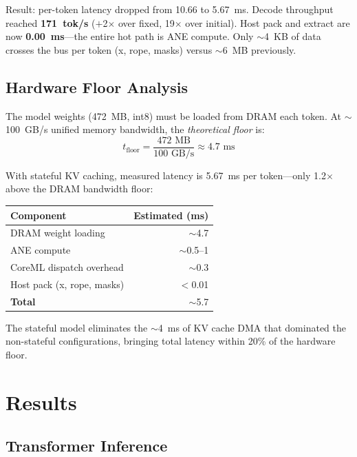\documentclass[11pt,twocolumn]{article}
\begin{document}
Result: per-token latency dropped from 10.66 to 5.67~ms.  Decode
throughput reached \textbf{171~tok/s} ($+$2$\times$ over fixed,
19$\times$ over initial).  Host pack and extract are now
\textbf{0.00~ms}---the entire hot path is ANE compute.  Only
$\sim$4~KB of data crosses the bus per token (x, rope, masks) versus
$\sim$6~MB previously.

\subsection{Hardware Floor Analysis}

The model weights (472~MB, int8) must be loaded from DRAM each token.
At $\sim$100~GB/s unified memory bandwidth, the \emph{theoretical
floor} is:
\begin{equation}
t_\text{floor} = \frac{472 \text{ MB}}{100 \text{ GB/s}} \approx 4.7 \text{ ms}
\end{equation}

With stateful KV caching, measured latency is 5.67~ms per token---only
1.2$\times$ above the DRAM bandwidth floor:

\begin{center}
\footnotesize
\begin{tabular}{lr}
\toprule
\textbf{Component} & \textbf{Estimated (ms)} \\
\midrule
DRAM weight loading & $\sim$4.7 \\
ANE compute & $\sim$0.5--1 \\
CoreML dispatch overhead & $\sim$0.3 \\
Host pack (x, rope, masks) & $<$0.01 \\
\midrule
\textbf{Total} & $\sim$5.7 \\
\bottomrule
\end{tabular}
\end{center}

The stateful model eliminates the $\sim$4~ms of KV cache DMA that
dominated the non-stateful configurations, bringing total latency
within 20\% of the hardware floor.


\section{Results}
\label{sec:results}

\subsection{Transformer Inference}
\end{document}
